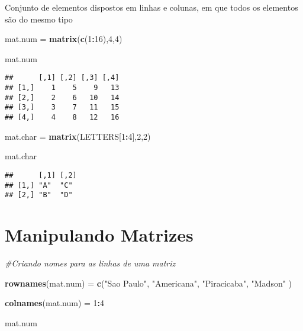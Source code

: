 \documentclass[]{article}
\newenvironment{Shaded}{\begin{snugshade}}{\end{snugshade}}
\newcommand{\KeywordTok}[1]{\textcolor[rgb]{0.13,0.29,0.53}{\textbf{#1}}}
\newcommand{\DecValTok}[1]{\textcolor[rgb]{0.00,0.00,0.81}{#1}}
\newcommand{\StringTok}[1]{\textcolor[rgb]{0.31,0.60,0.02}{#1}}
\newcommand{\CommentTok}[1]{\textcolor[rgb]{0.56,0.35,0.01}{\textit{#1}}}
\newcommand{\OperatorTok}[1]{\textcolor[rgb]{0.81,0.36,0.00}{\textbf{#1}}}
\newcommand{\NormalTok}[1]{#1}
\begin{document}
Conjunto de elementos dispostos em linhas e colunas, em que todos os
elementos são do mesmo tipo

\begin{Shaded}
\begin{Highlighting}[]
\NormalTok{mat.num  =}\StringTok{ }\KeywordTok{matrix}\NormalTok{(}\KeywordTok{c}\NormalTok{(}\DecValTok{1}\OperatorTok{:}\DecValTok{16}\NormalTok{),}\DecValTok{4}\NormalTok{,}\DecValTok{4}\NormalTok{)}

\NormalTok{mat.num}
\end{Highlighting}
\end{Shaded}

\begin{verbatim}
##      [,1] [,2] [,3] [,4]
## [1,]    1    5    9   13
## [2,]    2    6   10   14
## [3,]    3    7   11   15
## [4,]    4    8   12   16
\end{verbatim}

\begin{Shaded}
\begin{Highlighting}[]
\NormalTok{mat.char =}\StringTok{ }\KeywordTok{matrix}\NormalTok{(LETTERS[}\DecValTok{1}\OperatorTok{:}\DecValTok{4}\NormalTok{],}\DecValTok{2}\NormalTok{,}\DecValTok{2}\NormalTok{)}

\NormalTok{mat.char}
\end{Highlighting}
\end{Shaded}

\begin{verbatim}
##      [,1] [,2]
## [1,] "A"  "C" 
## [2,] "B"  "D"
\end{verbatim}

\section{Manipulando Matrizes}\label{manipulando-matrizes}

\begin{Shaded}
\begin{Highlighting}[]
\CommentTok{#Criando nomes para as linhas de uma matriz}

\KeywordTok{rownames}\NormalTok{(mat.num) =}\StringTok{ }\KeywordTok{c}\NormalTok{(}\StringTok{"Sao Paulo"}\NormalTok{, }\StringTok{"Americana"}\NormalTok{, }\StringTok{"Piracicaba"}\NormalTok{, }\StringTok{"Madson"}\NormalTok{ )}

\KeywordTok{colnames}\NormalTok{(mat.num) =}\StringTok{ }\DecValTok{1}\OperatorTok{:}\DecValTok{4}

\NormalTok{mat.num}
\end{Highlighting}
\end{Shaded}
\end{document}
